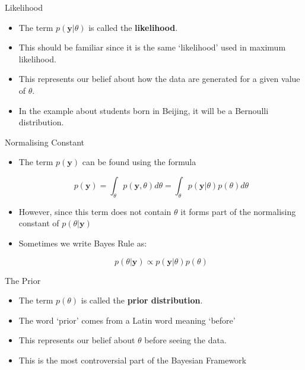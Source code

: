 \documentclass[10pt]{beamer}
\begin{document}
\begin{frame}{Likelihood}
  \begin{itemize}
  \item The term $p({\bm y}|\theta)$ is called the {\bf likelihood}.

  \item This should be familiar since it is the same `likelihood' used in maximum likelihood.

  \item This represents our belief about how the data are generated for a given value of $\theta$.

  \item In the example about students born in Beijing, it will be a Bernoulli distribution.
  \end{itemize}
\end{frame}
\begin{frame}{Normalising Constant}
  \begin{itemize}
  \item The term $p({\bm y})$ can be found using the formula

    \begin{equation}
      p({\bm y})=\int_{\theta}p({\bm y},\theta)d\theta=\int_{\theta}p({\bm y}|\theta)p(\theta)d\theta
    \end{equation}

  \item However, since this term does not contain $\theta$ it forms part of the normalising constant of $p(\theta|{\bm y})$

  \item Sometimes we write Bayes Rule as:

    \begin{equation}
      p(\theta|{\bm y})\propto p({\bm y}|\theta)p(\theta)
    \end{equation}
  \end{itemize}
\end{frame}
\begin{frame}{The Prior}
  \begin{itemize}
  \item The term $p(\theta)$ is called the {\bf prior distribution}.

  \item The word `prior' comes from a Latin word meaning `before'

  \item This represents our belief about $\theta$ before seeing the data.

  \item This is the most controversial part of the Bayesian Framework
  \end{itemize}
\end{frame}
\end{document}
